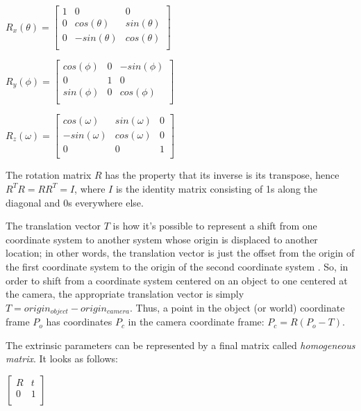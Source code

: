 \documentclass[msc, a4paper, classic, en]{ufbathesis}
\begin{document}
\begin{center}

$R_{x}(\theta) =
\begin{bmatrix}
1 & 0 & 0 \\
0 & cos(\theta) & sin(\theta) \\
0 & -sin(\theta) & cos(\theta) \\
\end{bmatrix}$

\vspace{10mm}

$R_{y}(\phi) =
\begin{bmatrix}
cos(\phi) & 0 & -sin(\phi) \\
0 & 1 & 0 \\
sin(\phi) & 0 & cos(\phi) \\
\end{bmatrix}$

\vspace{10mm}

$R_{z}(\omega) =
\begin{bmatrix}
cos(\omega) & sin(\omega) & 0 \\
-sin(\omega) & cos(\omega) & 0 \\
0 & 0 & 1 \\
\end{bmatrix}$

\end{center}

The rotation matrix $R$ has the property that its inverse is its transpose, hence $R^TR = RR^T = I$, where $I$ is the identity matrix consisting of 1s along the diagonal and 0s everywhere else.

The translation vector $T$ is how it's possible to represent a shift from one coordinate system to another system whose origin is displaced to another location; in other words, the translation vector is just the offset from the origin of the first coordinate system to the origin of the second coordinate system \cite{bradski2008learning}. So, in order to shift from a coordinate system centered on an object to one centered at the camera, the appropriate translation vector is simply $T = origin_{object} - origin_{camera}$. Thus, a point in the object (or world) coordinate frame $P_o$ has coordinates $P_c$ in the camera coordinate frame: $P_c = R(P_o - T)$.

The extrinsic parameters can be represented by a final matrix called \textit{homogeneous matrix}. It looks as follows:

\begin{center}
$\begin{bmatrix}
R & t \\
0 & 1 \\
\end{bmatrix}$
\end{center}
\end{document}
